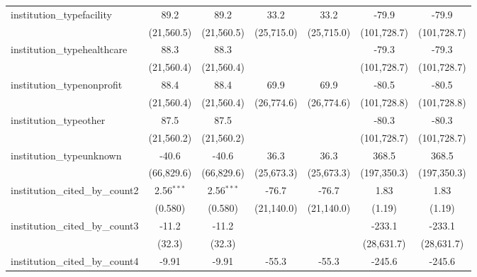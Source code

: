 \begin{tabular}{lcccccc}
   institution\_typefacility             & 89.2          & 89.2          & 33.2          & 33.2          & -79.9         & -79.9\\   
                                         & (21,560.5)    & (21,560.5)    & (25,715.0)    & (25,715.0)    & (101,728.7)   & (101,728.7)\\   
   institution\_typehealthcare           & 88.3          & 88.3          &               &               & -79.3         & -79.3\\   
                                         & (21,560.4)    & (21,560.4)    &               &               & (101,728.7)   & (101,728.7)\\   
   institution\_typenonprofit            & 88.4          & 88.4          & 69.9          & 69.9          & -80.5         & -80.5\\   
                                         & (21,560.4)    & (21,560.4)    & (26,774.6)    & (26,774.6)    & (101,728.8)   & (101,728.8)\\   
   institution\_typeother                & 87.5          & 87.5          &               &               & -80.3         & -80.3\\   
                                         & (21,560.2)    & (21,560.2)    &               &               & (101,728.7)   & (101,728.7)\\   
   institution\_typeunknown              & -40.6         & -40.6         & 36.3          & 36.3          & 368.5         & 368.5\\   
                                         & (66,829.6)    & (66,829.6)    & (25,673.3)    & (25,673.3)    & (197,350.3)   & (197,350.3)\\   
   institution\_cited\_by\_count2        & 2.56$^{***}$  & 2.56$^{***}$  & -76.7         & -76.7         & 1.83          & 1.83\\   
                                         & (0.580)       & (0.580)       & (21,140.0)    & (21,140.0)    & (1.19)        & (1.19)\\   
   institution\_cited\_by\_count3        & -11.2         & -11.2         &               &               & -233.1        & -233.1\\   
                                         & (32.3)        & (32.3)        &               &               & (28,631.7)    & (28,631.7)\\   
   institution\_cited\_by\_count4        & -9.91         & -9.91         & -55.3         & -55.3         & -245.6        & -245.6\\   

\end{tabular}
